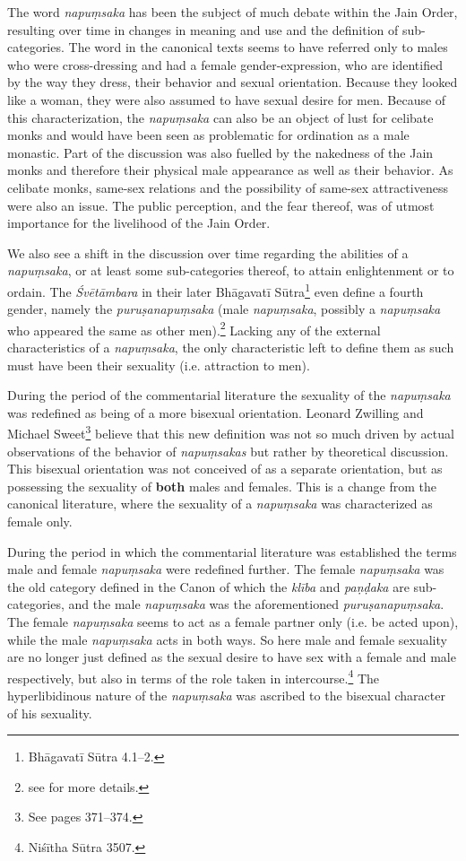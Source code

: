 The word {\em napuṃsaka} has been the subject of much debate within the Jain Order, resulting over time in changes in meaning and use and the definition of sub-categories. The word in the canonical texts seems to have referred only to males who were cross-dressing and had a female gender-expression, who are identified by the way they dress, their behavior and sexual orientation. Because they looked like a woman, they were also assumed to have sexual desire for men. Because of this characterization, the {\em napuṃsaka} can also be an object of lust for celibate monks and would have been seen as problematic for ordination as a male monastic. Part of the discussion was also fuelled by the nakedness of the Jain monks and therefore their physical male appearance as well as their behavior. As celibate monks, same-sex relations and the possibility of same-sex attractiveness were also an issue. The public perception, and the fear thereof, was of utmost importance for the livelihood of the Jain Order. 

We also see a shift in the discussion over time regarding the abilities of a {\em napuṃsaka}, or at least some sub-categories thereof, to attain enlightenment or to ordain. The {\em Śvētāmbara} in their later Bhāgavatī Sūtra\footnote{Bhāgavatī Sūtra 4.1–2.} even define a fourth gender, namely the {\em puruṣanapuṃsaka} (male {\em napuṃsaka}, possibly a {\em napuṃsaka} who appeared the same as other men).\footnote{see \cite{zwilling} for more details.} Lacking any of the external characteristics of a {\em napuṃsaka}, the only characteristic left to define them as such must have been their sexuality (i.e. attraction to men).

During the period of the commentarial literature the sexuality of the {\em napuṃsaka} was redefined as being of a more bisexual orientation. Leonard Zwilling and Michael Sweet\footnote{See \cite{zwilling} pages 371–374.} believe that this new definition was not so much driven by actual observations of the behavior of {\em napuṃsakas} but rather by theoretical discussion. This bisexual orientation was not conceived of as a separate orientation, but as possessing the sexuality of \textbf{both} males and females. This is a change from the canonical literature, where the sexuality of a {\em napuṃsaka} was characterized as female only.

During the period in which the commentarial literature was established the terms male and female {\em napuṃsaka} were redefined further. The female {\em napuṃsaka} was the old category defined in the Canon of which the {\em klība} and {\em paṇḍaka} are sub-categories, and the male {\em napuṃsaka} was the aforementioned {\em puruṣanapuṃsaka}. The female {\em napuṃsaka} seems to act as a female partner only (i.e. be acted upon), while the male {\em napuṃsaka} acts in both ways. So here male and female sexuality are no longer just defined as the sexual desire to have sex with a female and male respectively, but also in terms of the role taken in intercourse.\footnote{Niśītha Sūtra 3507.} The hyperlibidinous nature of the {\em napuṃsaka} was ascribed to the bisexual character of his sexuality.

